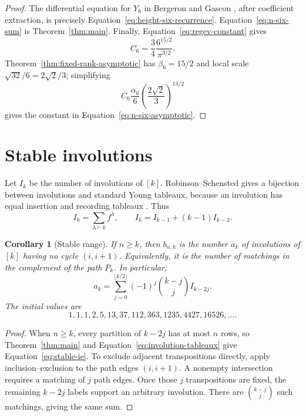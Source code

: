 \documentclass[11pt]{article}
\newtheorem{corollary}[theorem]{Corollary}
\theoremstyle{definition}
\begin{document}
\begin{proof}
The differential equation for $Y_6$ in Bergeron and Gascon
\cite{BergeronGascon2000}, after coefficient extraction, is precisely
Equation~\eqref{eq:height-six-recurrence}.  Equation~\eqref{eq:n-six-sum}
is Theorem~\ref{thm:main}.  Finally,
Equation~\eqref{eq:regev-constant} gives
\[
 C_6=\frac{3}{4}\frac{6^{15/2}}{\pi^{3/2}}.
\]
Theorem~\ref{thm:fixed-rank-asymptotic} has
$\beta_6=15/2$ and local scale $\sqrt{32}/6=2\sqrt2/3$; simplifying
\[
 C_6\frac{\alpha_6}{6}
 \left(\frac{2\sqrt2}{3}\right)^{13/2}
\]
gives the constant in Equation~\eqref{eq:n-six-asymptotic}.
\end{proof}

\section{Stable involutions}

Let $I_k$ be the number of involutions of $[k]$.  Robinson--Schensted gives a
bijection between involutions and standard Young tableaux, because an
involution has equal insertion and recording tableaux
\cite{Sagan2001,StanleyEC2}.  Thus
\begin{equation}\label{eq:involution-tableaux}
 I_k=\sum_{\lambda\vdash k}f^\lambda,
 \qquad I_k=I_{k-1}+(k-1)I_{k-2}.
\end{equation}

\begin{corollary}[Stable range]\label{cor:stable}
If $n\ge k$, then $b_{n,k}$ is the number $a_k$ of involutions of $[k]$
having no cycle $(i,i+1)$.  Equivalently, it is the number of matchings in
the complement of the path $P_k$.  In particular,
\begin{equation}\label{eq:stable-ie}
 a_k=\sum_{j=0}^{\lfloor k/2\rfloor}(-1)^j
 \binom{k-j}{j}I_{k-2j}.
\end{equation}
The initial values are
\[
1,1,1,2,5,13,37,112,363,1235,4427,16526,\ldots.
\]
\end{corollary}

\begin{proof}
When $n\ge k$, every partition of $k-2j$ has at most $n$ rows, so
Theorem~\ref{thm:main} and Equation~\eqref{eq:involution-tableaux} give
Equation~\eqref{eq:stable-ie}.  To exclude adjacent transpositions directly,
apply inclusion--exclusion to the path edges $(i,i+1)$.  A nonempty
intersection requires a matching of $j$ path edges.  Once those $j$
transpositions are fixed, the remaining $k-2j$ labels support an arbitrary
involution.  There are $\binom{k-j}{j}$ such matchings, giving the same sum.
\end{proof}
\end{document}
